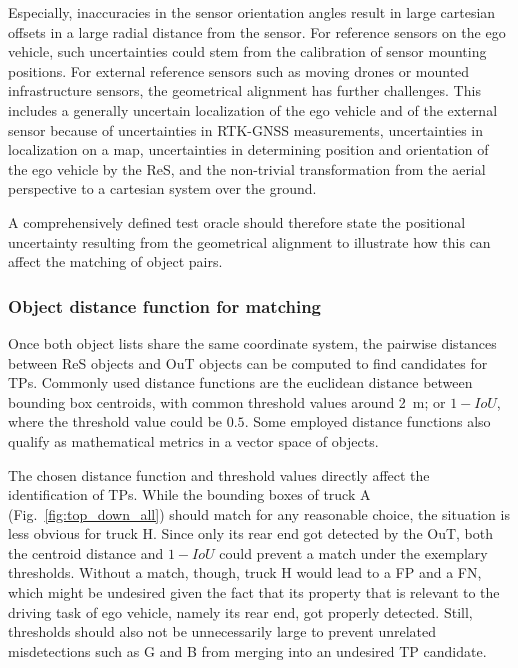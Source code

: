 \documentclass[conference]{IEEEtran}
\begin{document}
Especially, inaccuracies in the sensor orientation angles result in large cartesian offsets in a large radial distance from the sensor.
For reference sensors on the ego vehicle, such uncertainties could stem from the calibration of sensor mounting positions. 
For external reference sensors such as moving drones or mounted infrastructure sensors, the geometrical alignment has further challenges. %
This includes a generally uncertain localization of the ego vehicle and of the external sensor because of uncertainties in RTK-GNSS measurements, uncertainties in localization on a map, uncertainties in determining position and orientation of the ego vehicle by the ReS, and the non-trivial transformation from the aerial perspective to a cartesian system over the ground. 

A comprehensively defined test oracle should therefore state the positional uncertainty resulting from the geometrical alignment to illustrate how this can affect the matching of object pairs.

\subsubsection{Object distance function for matching}
\label{sec:distance_function}

Once both object lists share the same coordinate system, the pairwise distances between ReS objects and OuT objects can be computed to find candidates for TPs. 
Commonly used distance functions are the euclidean distance between bounding box centroids, with common threshold values around \SI{2}{\metre}; or $1 - IoU$, where the threshold value could be $0.5$.
Some employed distance functions also qualify as mathematical metrics in a vector space of objects.

The chosen distance function and threshold values directly affect the identification of TPs. 
While the bounding boxes of truck A (Fig.~\ref{fig:top_down_all}) should match for any reasonable choice, the situation is less obvious for truck H.
Since only its rear end got detected by the OuT, both the centroid distance and $1 - IoU$ could prevent a match under the exemplary thresholds. 
Without a match, though, truck H would lead to a FP and a FN, which might be undesired given the fact that its property that is relevant to the driving task of ego vehicle, namely its rear end, got properly detected. 
Still, thresholds should also not be unnecessarily large to prevent unrelated misdetections such as G and B from merging into an undesired TP candidate.
\end{document}
